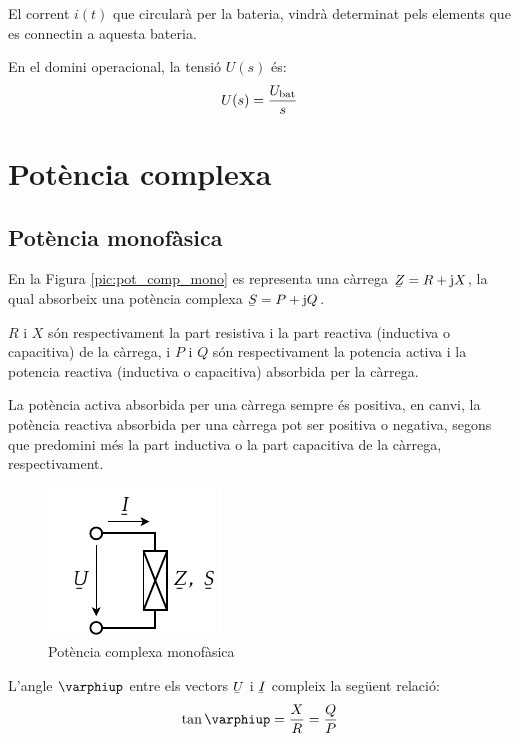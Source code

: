 El corrent $i(t)$ que circular\`{a} per la bateria, vindr\`{a} determinat
pels elements que es connectin a aquesta bateria.

 En el domini operacional, la
tensi\'{o} $U(s)$ \'{e}s:
\begin{equation}
   U(s) = \frac{U_\mathrm{bat}}{s}
\end{equation}

\section{Pot\`{e}ncia complexa}\label{sec:pot_complex} 

\subsection{Pot\`{e}ncia monof\`{a}sica} 

En la Figura \vref{pic:pot_comp_mono} es representa una c\`{a}rrega $\cmplx{Z}=R+\ju X$, la
qual absorbeix una pot\`{e}ncia complexa $\cmplx{S} = P + \ju Q$.

$R$ i $X$ s\'{o}n respectivament la part resistiva i la part reactiva
(inductiva o capacitiva) de la c\`{a}rrega, i $P$ i $Q$ s\'{o}n
respectivament la potencia activa i la potencia reactiva (inductiva
o capacitiva) absorbida per la c\`{a}rrega.

La pot\`{e}ncia activa absorbida per una c\`{a}rrega sempre \'{e}s positiva, en
canvi, la pot\`{e}ncia reactiva absorbida per una c\`{a}rrega pot ser
positiva o negativa, segons que predomini m\'{e}s la part inductiva o la
part capacitiva de la c\`{a}rrega, respectivament.

\begin{figure}[htb]
\centering
    \includegraphics{Imatges/Cap-Fonaments-Potencia-Monof.pdf}
\caption{Pot\`{e}ncia complexa monof\`{a}sica} \label{pic:pot_comp_mono}
\end{figure}

L'angle $\varphiup$ entre els vectors $\cmplx{U}$ i $\cmplx{I}$ compleix la seg\"{u}ent relaci\'{o}:
\begin{equation}
   \tan\varphiup = \frac{X}{R} = \frac{Q}{P}
\end{equation}

